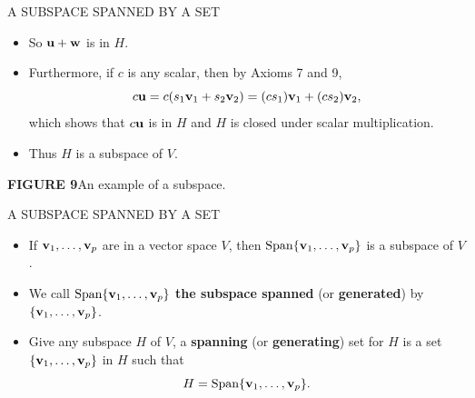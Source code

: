 \begin{frame}[shrink=13]{A SUBSPACE SPANNED BY A SET}
\begin{itemize}
\item So $\mathbf{u}+\mathbf{w}$ is in $H$.
\item Furthermore, if $c$ is any scalar, then by Axioms 7 and 9,
\[
c\mathbf{u}=c(s_1\mathbf{v}_1+s_2\mathbf{v}_2)=(cs_1)\mathbf{v}_1+(cs_2)\mathbf{v}_2,
\]
which shows that $c\mathbf{u}$ is in $H$ and $H$ is closed under scalar multiplication.
\item Thus $H$ is a subspace of $V$.
\end{itemize}
\begin{flushright}

\textbf{FIGURE 9}\quad An example of a subspace.
\end{flushright}
\end{frame}

\begin{frame}[shrink=9]{A SUBSPACE SPANNED BY A SET}
\begin{itemize}
\item {} If $\mathbf{v}_1,\ldots,\mathbf{v}_p$ are in a vector space $V$, then $\operatorname{Span}\{\mathbf{v}_1,\ldots,\mathbf{v}_p\}$ is a subspace of $V$.
\item We call $\operatorname{Span}\{\mathbf{v}_1,\ldots,\mathbf{v}_p\}$ \textbf{the subspace spanned} (or \textbf{generated}) by $\{\mathbf{v}_1,\ldots,\mathbf{v}_p\}$.
\item Give any subspace $H$ of $V$, a \textbf{spanning} (or \textbf{generating}) set for $H$ is a set $\{\mathbf{v}_1,\ldots,\mathbf{v}_p\}$ in $H$ such that
\[
H=\operatorname{Span}\{\mathbf{v}_1,\ldots,\mathbf{v}_p\}.
\]
\end{itemize}
\end{frame}

